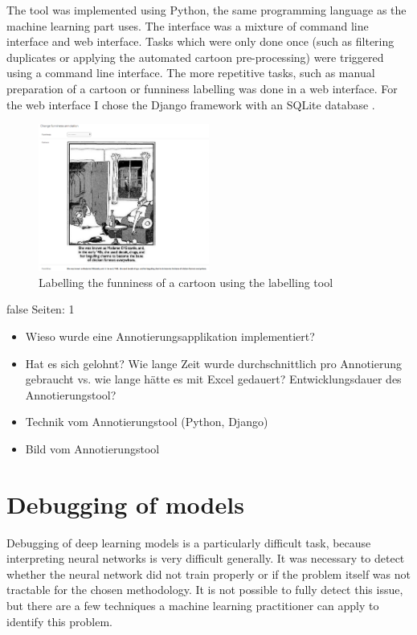 \documentclass[draft,final,oneside]{vutinfth} %
\begin{document}
The tool was implemented using Python, the same programming language as the machine learning part uses. The interface was a mixture of command line interface and web interface. Tasks which were only done once (such as filtering duplicates or applying the automated cartoon pre-processing) were triggered using a command line interface. The more repetitive tasks, such as manual preparation of a cartoon or funniness labelling was done in a web interface. For the web interface I chose the Django framework with an SQLite database \cite{django}\cite{sqlite}. 

\begin{figure}
	\centering
  	\includegraphics[width=0.5\textwidth]{graphics/labeling_tool.png}
	\caption{Labelling the funniness of a cartoon using the labelling tool}
	\label{fig:labellingtool}
\end{figure}

\if false
Seiten: 1

\begin{itemize}
\item Wieso wurde eine Annotierungsapplikation implementiert?
\item Hat es sich gelohnt? Wie lange Zeit wurde durchschnittlich pro Annotierung gebraucht vs. wie lange hätte es mit Excel gedauert? Entwicklungsdauer des Annotierungstool?
\item Technik vom Annotierungstool (Python, Django)
\item Bild vom Annotierungstool
\end{itemize}
\fi


\section{Debugging of models}

Debugging of deep learning models is a particularly difficult task, because interpreting neural networks is very difficult generally. It was necessary to detect whether the neural network did not train properly or if the problem itself was not tractable for the chosen methodology. It is not possible to fully detect this issue, but there are a few techniques a machine learning practitioner can apply to identify this problem.
\end{document}
